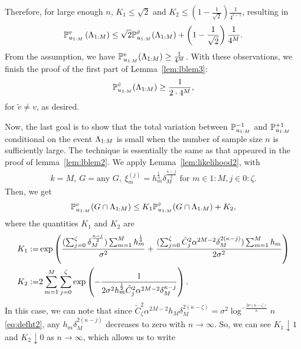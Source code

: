 Therefore, for large enough $n$, $K_1 \leq \sqrt 2$ and $K_2 \leq \left ( 1 - \frac{1}{\sqrt 2} \right )\frac{1}{4^{t-1}}$, resulting in
\begin{equation}
\mathbb{P}_{u_{1:M}}^v \left( \Lambda_{1:{M}} \right)\leq \sqrt 2 \mathbb{P}_{u_{1:M}}^{\tilde v} ( \Lambda_{1:{M}} ) + \left ( 1 - \frac{1}{\sqrt 2} \right )\frac{1}{4^{M}}.
\end{equation}
From the assumption, we have $\mathbb{P}_{u_{1:M}}^v (\Lambda_{1:{M}}) \geq \frac{1}{4^{M}}$.
With these observations, we finish the proof of the first part of Lemma~\ref{lem:lblem3}:
\begin{equation*}
	\mathbb{P}_{u_{1:M}}^{\tilde v} (\Lambda_{1:{M}}) \geq \frac{1}{2 \cdot 4^{M}},
\end{equation*}
for $\tilde v \neq v$, as desired.

Now, the last goal is to show that the total variation between 
$\mathbb{P}_{u_{1:M}}^{-1}$ and $\mathbb{P}_{u_{1:M}}^{+1}$ conditional on the event 
$\Lambda_{1:{M}}$ is small when the number of sample size $n$ 
is sufficiently large. The technique is essentially the 
same as that appeared in the proof of lemma~\ref{lem:lblem2}.
We apply Lemma~\ref{lem:likelihood2}, with
\begin{align*}
	k = M, ~
	G = \text{any } G, ~
	\xi_m^{(j)} = h_m^{\frac{1}{4}} \delta_{M}^{\frac{\kappa-j}{2}} \text{ for } m \in 1:M, j \in 0:\zeta.
\end{align*}
Then, we get 
\begin{equation*}
	\mathbb{P}_{u_{1:M}}^v ( G \cap \Lambda_{1:{M}} )
	\leq K_1 \mathbb{P}_{u_{1:M}}^{\tilde v} ( G \cap \Lambda_{1:{M}} ) + K_2,
\end{equation*}
where the quantities $K_1$ and $K_2$ are
\begin{align*}
	K_1 :=& \exp \left ( \frac{(\sum_{j=0}^\zeta \delta_{M}^{\frac{\kappa-j}{2}}) \sum_{m=1}^{M} h_m^{\frac{1}{4}} }{\sigma^2} + 
	\frac {(\sum_{j=0}^\zeta \tilde C_j^2 \alpha^{2M-2} \delta_{M}^{2(\kappa-j)}) \sum_{m=1}^{M} h_m}{2 \sigma^2}  \right )\\
	K_2 :=& 2 \sum_{m=1}^{M} \sum_{j=0}^{\zeta}
	\exp \left (  -\frac {1}{2 \sigma^2  h_{m}^{\frac{1}{2}} \tilde C_j^2 \alpha^{2M-2} \delta_{M}^{\kappa-j}}  \right ).
\end{align*}
In this case, we can note that since $\tilde C_\zeta^2 \alpha^{2M-2} h_M \delta_M^{2(\kappa-\zeta)} = \sigma^2 \log^{-\frac{2\nu(\kappa-\zeta)}{\kappa}} n$ \eqref{eq:defht2},
any $h_m \delta_M^{2(\kappa-j)}$ decreases to zero with $n \rightarrow \infty$.
So, we can see $K_1 \downarrow 1$ and $K_2 \downarrow 0$ as $n \rightarrow \infty$,
which allows us to write
